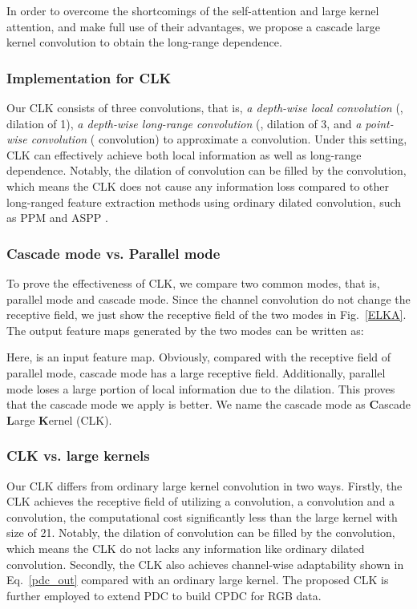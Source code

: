\documentclass[lettersize,journal]{IEEEtran}
\begin{document}
In order to overcome the shortcomings of the self-attention and large kernel attention, and make full use of their advantages, we propose a cascade large kernel convolution to obtain the long-range dependence. \fi

\subsubsection{Implementation for CLK}
Our CLK consists of three convolutions, that is, \textit{a depth-wise local convolution} (, dilation of 1), \textit{a depth-wise long-range convolution} (, dilation of 3, and \textit{a point-wise convolution} ( convolution) to approximate a  convolution. Under this setting, CLK can effectively achieve both local information as well as long-range dependence. Notably, the dilation of  convolution can be filled by the  convolution,
which means the CLK does not cause any information loss compared to other long-ranged feature extraction methods using ordinary dilated convolution, such as PPM \cite{zhao2017pyramid} and ASPP \cite{chen2017deeplab}.








\subsubsection{Cascade mode vs. Parallel mode} To prove the effectiveness of CLK, we compare two common modes, that is, parallel mode and cascade mode. Since the channel convolution do not change the receptive field, we just show the receptive field of the two modes in Fig.~\ref{ELKA}. 
The output feature maps generated by the two modes can be written as:



Here,  is an input feature map. Obviously, compared with the receptive field of parallel mode, cascade mode has a large receptive field. Additionally, parallel mode loses a large portion of local information due to the dilation. This proves that the cascade mode we apply is better. We name the cascade mode as \textbf{C}ascade \textbf{L}arge \textbf{K}ernel (CLK).


\subsubsection{CLK vs. large kernels}
Our CLK differs from ordinary large kernel convolution in two ways. Firstly, the CLK achieves the receptive field of  utilizing a  convolution, a  convolution and a  convolution, the computational cost significantly less than the large kernel with size of 21. Notably, the dilation of  convolution can be filled by the  convolution, which means the CLK do not lacks any information like ordinary dilated convolution. Secondly, the CLK also achieves channel-wise adaptability shown in Eq.~\ref{pdc_out} compared with an ordinary large kernel. 
The proposed CLK is further employed to extend PDC to build CPDC for RGB data.
\end{document}
